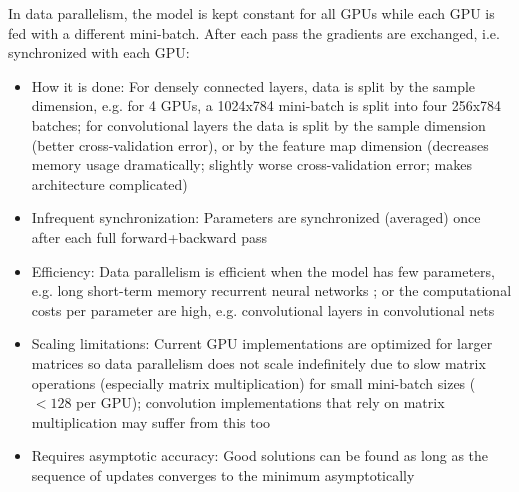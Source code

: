 \documentclass{article} %
\begin{document}
In data parallelism, the model is kept constant for all GPUs while each GPU is fed with a different mini-batch. After each pass the gradients are exchanged, i.e. synchronized with each GPU:
\begin{itemize} 	
	\item How it is done: For densely connected layers, data is split by the sample dimension, e.g. for 4 GPUs, a 1024x784 mini-batch is split into four 256x784 batches; for convolutional layers the data is split by the sample dimension (better cross-validation error), or by the feature map dimension (decreases memory usage dramatically; slightly worse cross-validation error; makes architecture complicated)
	\item Infrequent synchronization: Parameters are synchronized (averaged) once after each full forward+backward pass
	\item Efficiency: Data parallelism is efficient when the model has few parameters, e.g. long short-term memory recurrent neural networks \citep{hochreiter1997long}; or the computational costs per parameter are high, e.g. convolutional layers in convolutional nets
	\item Scaling limitations: Current GPU implementations are optimized for larger matrices so data parallelism does not scale indefinitely due to slow matrix operations (especially matrix multiplication) for small mini-batch sizes ($< 128$ per GPU); convolution implementations that rely on matrix multiplication may suffer from this too
	\item Requires asymptotic accuracy: Good solutions can be found as long as the sequence of updates converges to the minimum asymptotically \citep{seide20141}
\end{itemize}
\end{document}
